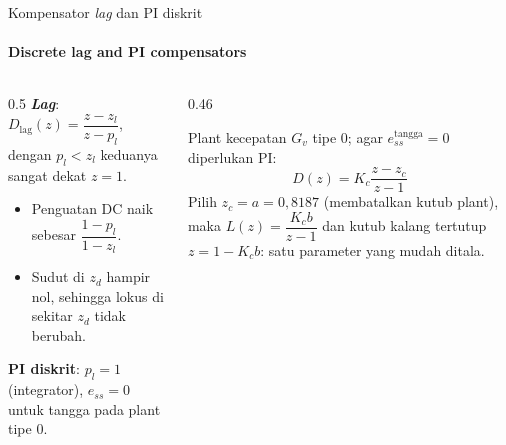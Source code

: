 \documentclass[aspectratio=169,10pt]{beamer}
\begin{document}
\begin{frame}{Kompensator \textit{lag} dan PI diskrit}
	\framesubtitle{Discrete lag and PI compensators}
	\begin{columns}[T]
		\begin{column}{0.5\textwidth}
			\small
			\textbf{\textit{Lag}}: $D_{\text{lag}}(z) = \dfrac{z - z_l}{z - p_l}$, dengan $p_l < z_l$ keduanya sangat dekat $z=1$.
			\begin{itemize}
				\item Penguatan DC naik sebesar $\dfrac{1-p_l}{1-z_l}$.
				\item Sudut di $z_d$ hampir nol, sehingga lokus di sekitar $z_d$ tidak berubah.
			\end{itemize}
			\textbf{PI diskrit}: $p_l = 1$ (integrator), $e_{ss}=0$ untuk tangga pada plant tipe 0.
		\end{column}
		\begin{column}{0.46\textwidth}
			\begin{exampleblock}{Plant kecepatan}
				\small
				$G_v$ tipe 0; agar $e_{ss}^{\text{tangga}}=0$ diperlukan PI:
				\[
					D(z) = K_c\frac{z - z_c}{z-1}
				\]
				Pilih $z_c = a = 0{,}8187$ (membatalkan kutub plant), maka $L(z) = \dfrac{K_cb}{z-1}$ dan kutub kalang tertutup $z = 1 - K_cb$: satu parameter yang mudah ditala.
			\end{exampleblock}
		\end{column}
	\end{columns}
\end{frame}
\end{document}

